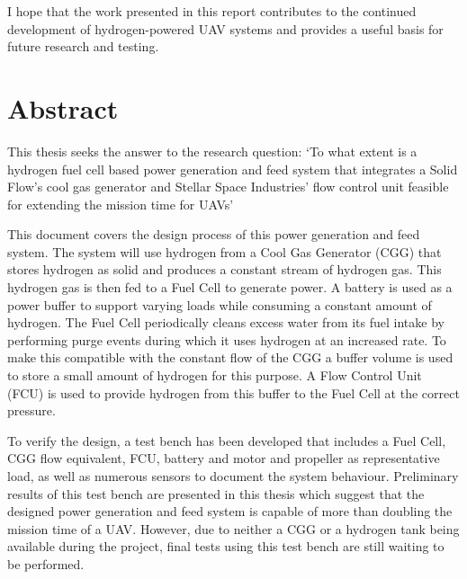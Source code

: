 \documentclass[10pt,a4paper]{report}
\begin{document}
I hope that the work presented in this report contributes to the continued development of hydrogen-powered UAV systems and provides a useful basis for future research and testing.

\chapter*{Abstract}
This thesis seeks the answer to the research question: `To what extent is a hydrogen fuel cell based power generation and feed system that integrates a Solid Flow's cool gas generator and Stellar Space Industries' flow control unit feasible for extending the mission time for UAVs'

This document covers the design process of this power generation and feed system. The system will use hydrogen from a Cool Gas Generator (CGG) that stores hydrogen as solid  and produces a constant stream of hydrogen gas. This hydrogen gas is then fed to a Fuel Cell to generate power. A battery is used as a power buffer to support varying loads while consuming a constant amount of hydrogen. The Fuel Cell periodically cleans excess water from its fuel intake by performing purge events during which it uses hydrogen at an increased rate. To make this compatible with the constant flow of the CGG a buffer volume is used to store a small amount of hydrogen for this purpose. A Flow Control Unit (FCU) is used to provide hydrogen from this buffer to the Fuel Cell at the correct pressure.

To verify the design, a test bench has been developed that includes a Fuel Cell, CGG flow equivalent, FCU, battery and motor and propeller as representative load, as well as numerous sensors to document the system behaviour. Preliminary results of this test bench are presented in this thesis which suggest that the designed power generation and feed system is capable of more than doubling the mission time of a UAV. However, due to neither a CGG or a hydrogen tank being available during the project, final tests using this test bench are still waiting to be performed.

\newpage
{\large \tableofcontents}
\newpage
\listoffigures
{}
\listoftables
{}










\begin{appendices}
    
    
    
\end{appendices}

\newpage

\end{document}
